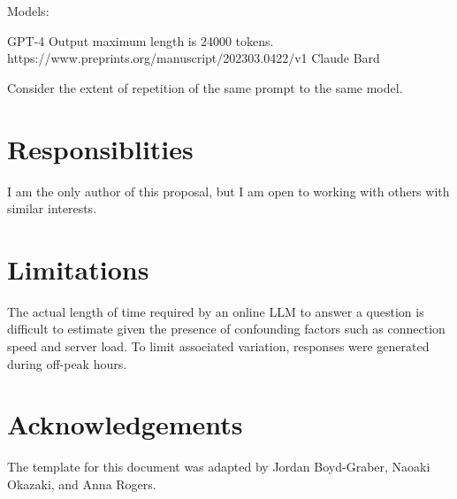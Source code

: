 \documentclass[11pt]{article}
\begin{document}
Models:

GPT-4
Output maximum length is 24000 tokens. https://www.preprints.org/manuscript/202303.0422/v1
Claude
Bard

Consider the extent of repetition of the same prompt to the same model.

\section{Responsiblities}

I am the only author of this proposal, but I am open to working with others with similar interests.

\section*{Limitations}

The actual length of time required by an online LLM to answer a question is difficult to estimate given the presence of confounding factors such as connection speed and server load. To limit associated variation, responses were generated during off-peak hours.

\section*{Acknowledgements}
The template for this document was adapted by Jordan Boyd-Graber, Naoaki Okazaki, and Anna Rogers.



\end{document}
